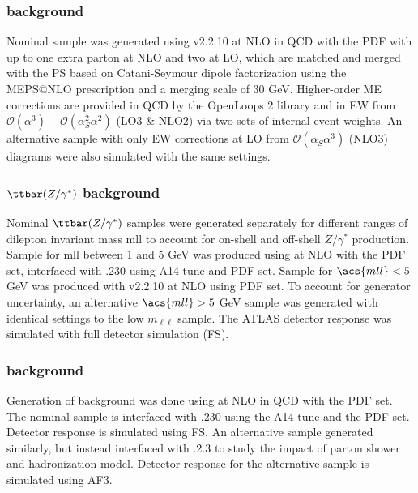 \documentclass[../thesis.tex]{subfiles}
\begin{document}
\subsubsection*{\ttW background}
Nominal \ttW sample was generated using \sherpa v2.2.10 \citep{Bothmann:2019yzt} at \acs{NLO} in \acs{QCD} with the \nnpdfnnlo \citep{Ball:2014uwa} \acs{PDF} with up to one extra parton at \acs{NLO} and two at \acs{LO}, which are matched and merged with the \sherpa \acs{PS} based on Catani-Seymour dipole factorization \citep{Schumann:2007mg} using the MEPS@NLO prescription \citep{Hoeche:2011fd, Hoeche:2012yf, Catani:2001cc, Hoeche:2009rj} and a merging scale of 30 GeV. Higher-order \acs{ME} corrections are provided in \acs{QCD} by the OpenLoops 2 library \citep{Cascioli:2011va, Denner:2016kdg, Buccioni:2019sur} and in \acs{EW} from $\mathcal{O}(\alpha^3)+\mathcal{O}(\alpha^2_S\alpha^2)$ (LO3 \& NLO2) via two sets of internal event weights. An alternative sample with only \acs{EW} corrections at \acs{LO} from $\mathcal{O}(\alpha_S\alpha^3)$ (NLO3) diagrams were also simulated with the same settings.
\subsubsection*{$\ttbar(Z/\gamma^*)$ background}
Nominal $\ttbar(Z/\gamma^*)$ samples were generated separately for different ranges of dilepton invariant mass \acs{mll} to account for on-shell and off-shell $Z/\gamma^*$ production. Sample for \acs{mll} between 1 and 5 GeV was produced using \mgamc \citep{Alwall:2014hca} at \acs{NLO} with the \nnpdfnlo \citep{Ball:2014uwa} \acs{PDF} set, interfaced with \pythia.230 \citep{Sjostrand:2014zea} using A14 tune \citep{ATL-PHYS-PUB-2014-021} and \nnpdftwo \acs{PDF} set. Sample for $\acs{mll} < 5$ GeV was produced with \sherpa v2.2.10 \citep{Bothmann:2019yzt} at \acs{NLO} using \nnpdfnnlo \acs{PDF} set. To account for generator uncertainty, an alternative $\acs{mll}>5$ GeV sample was generated with identical settings to the low $m_{\ell\ell}$ sample. The ATLAS detector response was simulated with full detector simulation (\acs{FS}).
\subsubsection*{\ttH background}
Generation of \ttH background was done using \powhegbox \citep{Frixione:2007nw, Nason:2004rx,Frixione:2007vw, Alioli:2010xd} at \acs{NLO} in \acs{QCD} with the \nnpdfnlo \acs{PDF} \citep{Ball:2014uwa} set. The nominal sample is interfaced with \pythia.230 \citep{Sjostrand:2014zea} using the A14 tune \citep{ATL-PHYS-PUB-2014-021} and the \nnpdftwo \citep{Ball:2012cx} \acs{PDF} set. Detector response is simulated using \acs{FS}. An alternative \ttH sample generated similarly, but instead interfaced with \herwigseven.2.3 \citep{Bahr:2008pv, Bellm:2015jjp} to study the impact of parton shower and hadronization model. Detector response for the alternative sample is simulated using \acs{AF3}.
\end{document}
